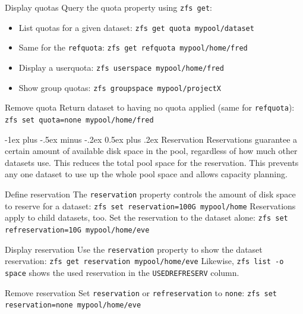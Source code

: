 \documentclass[10pt,landscape,letter]{article}
\makeatletter
\renewcommand{\section}{\@startsection{section}{1}{0mm}%
                                {-1ex plus -.5ex minus -.2ex}%
                                {0.5ex plus .2ex}%
                                {\normalfont\large\bfseries}}
\makeatother
\begin{document}
\begin{multicols}{3}
\begin{Description}
		\item[Display quotas] Query the quota property using \texttt{zfs get}:
      \begin{itemize}
        \item List quotas for a given dataset: \texttt{zfs get quota mypool/dataset}
        \item Same for the \texttt{refquota}: \texttt{zfs get refquota mypool/home/fred}
        \item Display a userquota: \texttt{zfs userspace mypool/home/fred}
        \item Show group quotas: \texttt{zfs groupspace mypool/projectX}
      \end{itemize}
    \item[Remove quota] Return dataset to having no quota applied (same for \texttt{refquota}):
      \texttt{zfs set quota=none mypool/home/fred}
	\end{Description}

	\section{Reservation}
  Reservations guarantee a certain amount of available disk space in the pool,
  regardless of how much other datasets use. This reduces the total pool space
  for the reservation. This prevents any one dataset to use up the whole pool
  space and allows capacity planning.

	\begin{Description}
    \item[Define reservation] The \texttt{reservation} property controls the
      amount of disk space to reserve for a dataset: \texttt{zfs set
      reservation=100G mypool/home} Reservations apply to child datasets,
      too. Set the reservation to the dataset alone: \texttt{zfs set
      refreservation=10G mypool/home/eve}
    \item[Display reservation] Use the \texttt{reservation} property to show
      the dataset reservation: \texttt{zfs get reservation
      mypool/home/eve} Likewise, \texttt{zfs list -o space} shows the used
      reservation in the \texttt{USEDREFRESERV} column.
    \item[Remove reservation] Set \texttt{reservation} or
      \texttt{refreservation} to \texttt{none}: \texttt{zfs set
      reservation=none mypool/home/eve}
	\end{Description}


\end{multicols}
\end{document}
